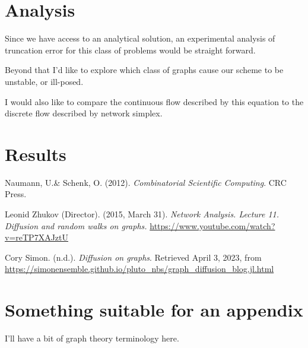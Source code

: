 \documentclass[11pt]{article}
\begin{document}
%
%
%

\section{Analysis} 
Since we have access to an analytical solution, an experimental analysis of truncation error for this class of problems would be 
straight forward. 

Beyond that I'd like to explore which class of graphs cause our scheme to be unstable, or ill-posed. 

I would also like to compare the continuous flow described by this equation to the discrete flow described by 
network simplex. 



\section{Results}  

\begin{thebibliography}{3}  %


Naumann, U.\& Schenk, O. (2012). \emph{Combinatorial Scientific Computing}. CRC Press.

Leonid Zhukov (Director). (2015, March 31). \emph{Network Analysis. Lecture 11. Diffusion and random walks on graphs.} \href{https://www.youtube.com/watch?v=reTP7XAJztU}{https://www.youtube.com/watch?v=reTP7XAJztU}

Cory Simon. (n.d.). \emph{Diffusion on graphs}. Retrieved April 3, 2023, from \href{https://simonensemble.github.io/pluto_nbs/graph_diffusion_blog.jl.html}{https://simonensemble.github.io/pluto\_nbs/graph\_diffusion\_blog.jl.html}


\end{thebibliography}

\appendix
\section{Something suitable for an appendix}
I'll have a bit of graph theory terminology here.   %
\end{document}
